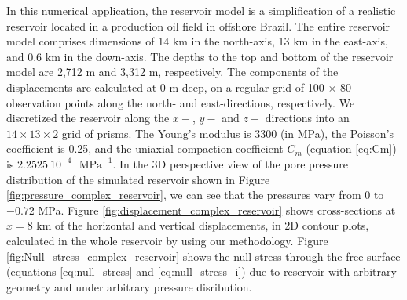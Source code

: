 \documentclass[journal abbreviation, manuscript]{copernicus}
\begin{document}
In this numerical application, the reservoir model is a simplification of a realistic reservoir located in a production oil field in offshore Brazil.
The entire reservoir model comprises dimensions of 14 km in the north-axis, 13 km in the
east-axis, and 0.6 km in the down-axis. 
The depths to the top and bottom of the reservoir model are 2,712 m and 3,312 m, respectively. 
The components of the displacements are calculated at 0 m deep, 
on a regular grid of 100 $\times$ 80  observation points along the north- and east-directions, respectively. 
We  discretized the reservoir  along the $x-$, $y-$ and $z-$ directions into an $14 \times 13 \times 2$ grid of prisms.
The Young’s modulus is  3300 (in MPa), the Poisson's coefficient is 0.25, and
the uniaxial compaction coefficient $C_{m}$  (equation \ref{eq:Cm}) is $2.2525 \: 10^{-4}$
$\textrm{ MPa}^{-1}$.
In the 3D perspective view of the pore pressure distribution of the simulated reservoir shown in Figure \ref{fig:pressure_complex_reservoir}, we can see that the pressures vary from $0$ to $-0.72$ MPa.
Figure \ref{fig:displacement_complex_reservoir} shows cross-sections at $x  = 8$ km of the horizontal and vertical displacements, in 2D contour plots, calculated in the whole reservoir by using our methodology.
Figure \ref{fig:Null_stress_complex_reservoir} shows the  null stress through the free surface (equations \ref{eq:null_stress} and \ref{eq:null_stress_i}) due to reservoir with arbitrary geometry and under arbitrary pressure disribution.
\end{document}
